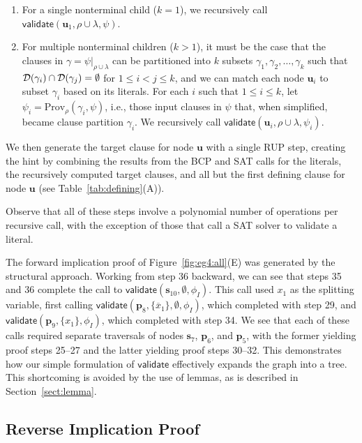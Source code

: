 \documentclass[twoside,11pt]{article}
\newcommand{\obar}[1]{\overline{#1}}
\newcommand{\dependencyset}{{\cal D}}
\newcommand{\passign}{\rho}
\newcommand{\validate}{\textsf{validate}}
\newcommand{\prov}{\textrm{Prov}}
\newcommand{\makenode}[1]{\mathbf{#1}}
\newcommand{\nodeu}{\makenode{u}}
\newcommand{\nodes}{\makenode{s}}
\newcommand{\nodep}{\makenode{p}}
\newcommand{\simplify}[2]{#1|_{#2}}
\begin{document}
\begin{enumerate}
\begin{enumerate}
\item For a single nonterminal child ($k = 1$), we recursively call
  $\validate \left(\nodeu_1, \passign \cup \lambda, \psi\right)$.
\item For multiple nonterminal children ($k > 1$),
  it must be the case that the clauses in
  $\gamma = \simplify{\psi}{\passign \cup \lambda}$ can be partitioned into $k$ subsets
  $\gamma_1, \gamma_2, \ldots, \gamma_k$ such that $\dependencyset(\gamma_i)
  \cap \dependencyset(\gamma_j) = \emptyset$ for $1 \leq i < j \leq k$,
  and we can match each node $\nodeu_i$ to subset $\gamma_i$ based on its
  literals.
  For each $i$ such that $1 \leq i \leq k$, let $\psi_i = \prov_{\passign}(\gamma_i, \psi)$, i.e., those input clauses in $\psi$ that, when simplified, became clause partition $\gamma_i$.
  We recursively call
  $\validate \left(\nodeu_i, \passign \cup \lambda, \psi_i\right)$.
\end{enumerate}
  We then generate the target clause for node $\nodeu$ with a single RUP step,
creating the hint by combining the results from the BCP and SAT calls for
  the literals, the recursively computed target clauses, and all but
  the first defining clause for node $\nodeu$
(see Table~\ref{tab:defining}(A)).
\end{enumerate}
Observe that
all of these steps involve a polynomial number of
operations per recursive call, with the exception of those that call
a SAT solver to validate a literal.

The forward implication proof of Figure~\ref{fig:eg4:all}(E) was
generated by the structural approach.  Working from step 36 backward,
we can see that steps 35 and 36 complete the call to
$\validate(\nodes_{10}, \emptyset, \phi_I)$.  This call used $x_1$ as
the splitting variable, first calling $\validate(\nodep_{8},
\{\obar{x}_1\}, \emptyset, \phi_I)$, which completed with step 29, and
$\validate(\nodep_{9}, \{x_1\}, \phi_I)$, which completed with step
34.  We see that each of these calls required separate traversals of
nodes $\nodes_7$, $\nodep_6$, and $\nodep_5$, with the former yielding
proof steps 25--27 and the latter yielding proof steps 30--32.  This
demonstrates how our simple formulation of $\validate$ effectively
expands the graph into a tree.  This shortcoming is avoided by the use of lemmas, as is described in Section~\ref{sect:lemma}.

\subsection{Reverse Implication Proof}
\end{document}
